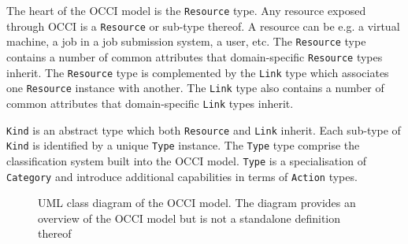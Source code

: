 \documentclass[10pt,a4paper,british]{article}
\newcommand{\hl}{\texttt}
\begin{document}
The heart of the OCCI model is the \hl{Resource} type. Any resource exposed
through OCCI is a \hl{Resource} or sub-type thereof.
A resource can be e.g. a virtual machine, a job in a job submission system, a
user, etc.
%
The \hl{Resource} type contains a number of common attributes that
domain-specific \hl{Resource} types inherit. The \hl{Resource} type is
complemented by the \hl{Link} type which associates one \hl{Resource} instance
with another.
%
The \hl{Link} type also contains a number of common attributes that
domain-specific \hl{Link} types inherit.

\hl{Kind} is an abstract type which both \hl{Resource} and \hl{Link} inherit.
Each sub-type of \hl{Kind} is identified by a unique \hl{Type} instance.
%
The \hl{Type} type comprise the classification system built into the OCCI
model. \hl{Type} is a specialisation of \hl{Category} and introduce additional
capabilities in terms of \hl{Action} types.

\begin{figure}[!h]
{\centering {} \par}
\caption{UML class diagram of the OCCI model. The diagram provides an
overview of the OCCI model but is not a standalone definition thereof}
\label{fig:occi_model}
\end{figure}
\end{document}
